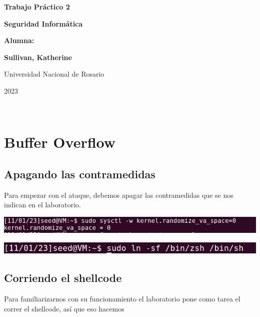 \documentclass[11pt]{article}
\begin{document}
\begin{titlepage}
    \begin{center}
        \vfill
        \vfill
            \vspace{0.7cm}
            \noindent\textbf{\Huge Trabajo Práctico 2}\par
            \noindent\textbf{\Huge Seguridad Informática}\par
            \vspace{.5cm}
        \vfill
        \noindent \textbf{\huge Alumna:}\par
        \vspace{.5cm}
        \noindent \textbf{\Large Sullivan, Katherine}\par
 
        \vfill
        \large Universidad Nacional de Rosario \par
        \noindent\large 2023
    \end{center}
\end{titlepage}
\ \par



\section{Buffer Overflow}

\subsection{Apagando las contramedidas}
Para empezar con el ataque, debemos apagar las contramedidas que se nos indican en el laboratorio. 

\begin{center}
\includegraphics[scale=0.7]{deshab1.png}
\end{center}

\begin{center}
\includegraphics[scale=0.8]{deshab2.png}
\end{center}

\subsection{Corriendo el shellcode}
Para familiarizarnos con su funcionamiento el laboratorio pone como tarea el correr el shellcode, así que eso hacemos
\end{document}
